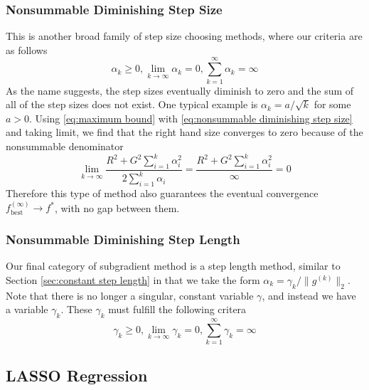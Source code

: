 \documentclass[journal,onecolumn]{IEEEtran}
\DeclareMathOperator{\best}{best}
\begin{document}
\subsubsection{Nonsummable Diminishing Step Size}\label{sec:nonsummable diminishing step size}
This is another broad family of step size choosing methods, where our criteria are as follows
\begin{equation}\label{eq:nonsummable diminishing step size}
\alpha_k \geq 0, \lim_{k \rightarrow \infty} \alpha_k = 0, \sum_{k=1}^{\infty} \alpha_k = \infty
\end{equation}
As the name suggests, the step sizes eventually diminish to zero and the sum of all of the step sizes does not exist. One typical example is \(\alpha_k = a/\sqrt{k}\) for some \(a > 0\). Using \eqref{eq:maximum bound} with \eqref{eq:nonsummable diminishing step size} and taking limit, we find that the right hand size converges to zero because of the nonsummable denominator
\begin{equation}\label{eq:nonsummable diminishing step size convergence}
\lim_{k \rightarrow \infty} \frac{R^2  + G^2 \sum^k_{i=1}\alpha^2_i}{2\sum^k_{i=1}\alpha_i} = \frac{R^2  + G^2 \sum^k_{i=1}\alpha^2_i}{\infty} = 0
\end{equation}
Therefore this type of method also guarantees the eventual convergence \(f^{(\infty)}_{\best} \rightarrow f^*\), with no gap between them.

\subsubsection{Nonsummable Diminishing Step Length}\label{sec:nonsummable diminishing step length}
Our final category of subgradient method is a step length method, similar to Section \ref{sec:constant step length} in that we take the form \(\alpha_k = \gamma_k / \|g^{(k)}\|_2\). Note that there is no longer a singular, constant variable \(\gamma\), and instead we have a variable \(\gamma_k\). These \(\gamma_k\) must fulfill the following critera
\begin{equation}\label{eq:nonsummable diminishing step length}
\gamma_k \geq 0, \lim_{k \rightarrow \infty} \gamma_k = 0, \sum_{k=1}^{\infty} \gamma_k = \infty
\end{equation}

\subsection{LASSO Regression}\label{sec:math lasso}
\end{document}
